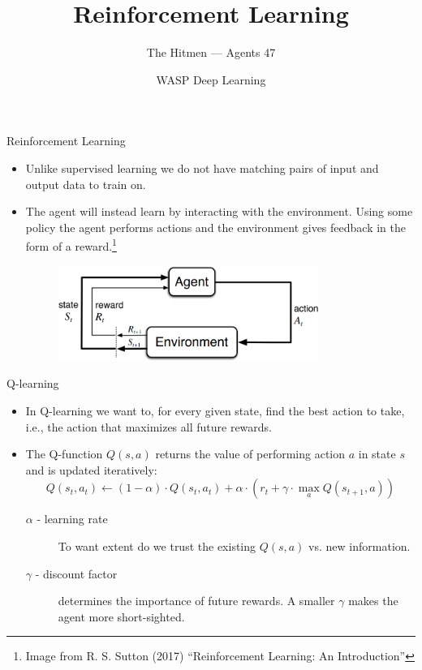 \documentclass{beamer}
\title{Reinforcement Learning}
\date{WASP Deep Learning}
\author[Agents 47]{The Hitmen --- Agents 47}
\begin{document}
\begin{frame}
  \titlepage
\end{frame}

\begin{frame}{Reinforcement Learning}
  \begin{itemize}
  \item Unlike supervised learning we do not have matching pairs of input and output data to train on.
  \item The agent will instead learn by interacting with the environment. Using some policy the agent performs actions and the environment gives feedback in the form of a reward.\footnote{Image from R. S. Sutton (2017) ``Reinforcement Learning: An Introduction''}
  \begin{figure}
    \centering
    \includegraphics[width=0.8\textwidth]{rl.png}
  \end{figure}
  \end{itemize}
\end{frame}

\begin{frame}{Q-learning}
  \begin{itemize}
  \item In Q-learning we want to, for every given state, find the best action to take, i.e., the action that maximizes all future rewards.
  \item The Q-function $Q(s,a)$ returns the value of performing action $a$ in state $s$ and is updated iteratively:
  \begin{displaymath}
    Q(s_{t},a_{t}) \leftarrow (1-\alpha) \cdot Q(s_{t},a_{t}) + \alpha \cdot  \left( r_{t} + \gamma \cdot \max_a Q(s_{t+1},a) \right)
  \end{displaymath}
  \begin{description}
    \item[$\alpha$ - learning rate] To want extent do we trust the existing $Q(s,a)$ vs. new information.
    \item[$\gamma$ - discount factor] determines the importance of future rewards. A smaller $\gamma$ makes the agent more short-sighted.
  \end{description}
  \end{itemize}
\end{frame}
\end{document}

